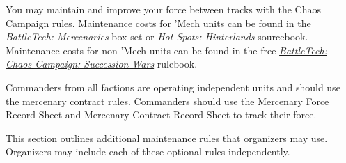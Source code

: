 You may maintain and improve your force between tracks with the Chaos Campaign rules.
Maintenance costs for 'Mech units can be found in the \emph{BattleTech: Mercenaries} box set or \emph{Hot Spots: Hinterlands} sourcebook.
Maintenance costs for non-'Mech units can be found in the free \emph{\href{https://store.catalystgamelabs.com/products/battletech-chaos-campaign-succession-wars}{BattleTech: Chaos Campaign: Succession Wars}} rulebook.

Commanders from all factions are operating independent units and should use the mercenary contract rules.
Commanders should use the Mercenary Force Record Sheet and Mercenary Contract Record Sheet to track their force.

This section outlines additional maintenance rules that organizers may use.
Organizers may include each of these optional rules independently.
